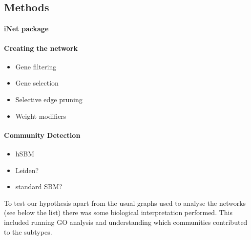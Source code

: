 \subsection{Methods} \label{Sec:N_II:methods}

\paragraph*{iNet package}

\paragraph*{Creating the network}

\begin{itemize}
    \item Gene filtering
    \item Gene selection
    \item Selective edge pruning
    \item Weight modifiers
\end{itemize}

\paragraph*{Community Detection}

\begin{itemize}
    \item hSBM
    \item Leiden?
    \item standard SBM?
\end{itemize}











To test our hypothesis apart from the usual graphs used to analyse the networks (see below the list) there was some biological interpretation performed. This included running GO analysis and understanding which communities contributed to the subtypes.

